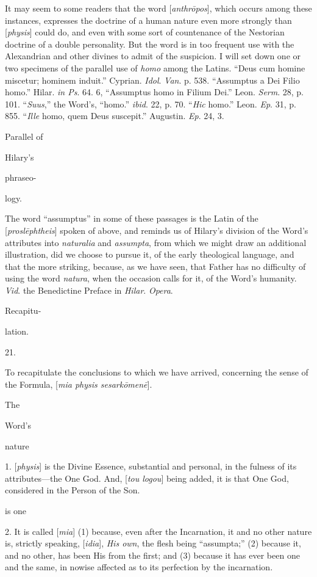 It may seem to some
readers that the word [\emph{anthr\={o}pos}], which occurs
among these instances, expresses the doctrine of a human
nature even more strongly than [\emph{physis}] could do, and
even with some sort of countenance of the Nestorian doctrine
of a double personality. But the word is in too frequent use
with the Alexandrian and other divines to admit of the
suspicion. I will set down one or two specimens of the
parallel use of \emph{homo} among the Latins. ``Deus cum homine
miscetur; hominem induit.'' Cyprian. \emph{Idol}. \emph{Van}. p.
538. ``Assumptus a Dei Filio homo.'' Hilar. \emph{in Ps}.
64. 6, ``Assumptus homo in Filium Dei.'' Leon. \emph{Serm}. 28,
p. 101. ``\emph{Suus},'' the Word's, ``homo.'' \emph{ibid}. 22, p.
70. ``\emph{Hic} homo.'' Leon. \emph{Ep}. 31, p. 855. ``\emph{Ille}
homo, quem Deus suscepit.'' Augustin. \emph{Ep}. 24, 3.

Parallel of

Hilary's

phraseo-

logy.

The word ``assumptus'' in some of these
passages is the Latin of the [\emph{prosl\={e}phtheis}]
spoken of above, and reminds us of Hilary's division of the
Word's attributes into \emph{naturalia} and \emph{assumpta},
from which we might draw an additional illustration, did we
choose to pursue it, of the early theological language, and
that the more striking, because, as we have seen, that Father
has no difficulty of using the word \emph{natura}, when the
occasion calls for it, of the Word's humanity. \emph{Vid}. the
Benedictine Preface in \emph{Hilar}. \emph{Opera}.

Recapitu-

lation.

21.

To recapitulate the
conclusions to which we have arrived, concerning the sense of
the Formula, [\emph{mia physis sesark\={o}men\={e}}].

The

Word's

nature

1. [\emph{physis}] is
the Divine Essence, substantial and personal, in the fulness
of its attributes—the One God. And, [\emph{tou logou}] being
added, it is that One God, considered in the Person of the
Son.

is one

2. It is called [\emph{mia}]
(1) because, even after the Incarnation, it and no other
nature is, strictly speaking, [\emph{idia}], \emph{His own},
the flesh being ``assumpta;'' (2) because it, and no other, has
been His from the first; and (3) because it has ever been one
and the same, in nowise affected as to its perfection by the
incarnation.

